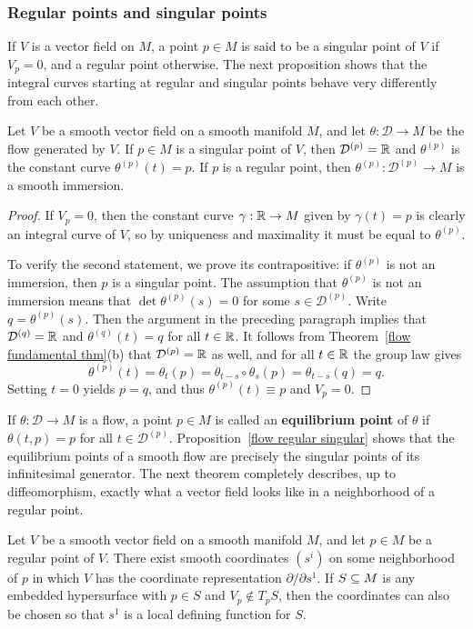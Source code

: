\subsubsection{Regular points and singular points}
If $V$ is a vector field on $M$, a point $p\in M$ is said to be a singular point of $V$ if $V_p=0$, and a regular point otherwise. The next proposition shows that the integral curves starting at regular and singular points behave very differently from each other.
\begin{proposition}\label{flow regular singular}
Let $V$ be a smooth vector field on a smooth manifold $M$, and let $\theta:\mathcal{D}\to M$ be the flow generated by $V$. If $p\in M$ is a singular point of $V$, then $\mathcal{D}^{(p)}=\mathbb{R}$ and $\theta^{(p)}$ is the constant curve $\theta^{(p)}(t)=p$. If $p$ is a regular point, then $\theta^{(p)}:\mathcal{D}^{(p)}\to M$ is a smooth immersion.
\end{proposition}
\begin{proof}
If $V_p=0$, then the constant curve $\gamma:\mathbb{R}\to M$ given by $\gamma(t)=p$ is clearly an integral curve of $V$, so by uniqueness and maximality it must be equal to $\theta^{(p)}$.\par
To verify the second statement, we prove its contrapositive: if $\theta^{(p)}$ is not an immersion, then $p$ is a singular point. The assumption that $\theta^{(p)}$ is not an immersion
means that $\det{\theta}^{(p)}(s)=0$ for some $s\in\mathcal{D}^{(p)}$. Write $q=\theta^{(p)}(s)$. Then the argument in the preceding paragraph implies that $\mathcal{D}^{(q)}=\mathbb{R}$ and $\theta^{(q)}(t)=q$ for all $t\in\mathbb{R}$. It follows from Theorem~\ref{flow fundamental thm}(b) that $\mathcal{D}^{(p)}=\mathbb{R}$ as well, and for all $t\in\mathbb{R}$ the group law gives
\[\theta^{(p)}(t)=\theta_t(p)=\theta_{t-s}\circ\theta_s(p)=\theta_{t-s}(q)=q.\]
Setting $t=0$ yields $p=q$, and thus $\theta^{(p)}(t)\equiv p$ and $V_p=0$.
\end{proof}
If $\theta:\mathcal{D}\to M$ is a flow, a point $p\in M$ is called an \textbf{equilibrium point} of $\theta$ if $\theta(t,p)=p$ for all $t\in\mathcal{D}^{(p)}$. Proposition~\ref{flow regular singular} shows that the equilibrium points of a smooth flow are precisely the singular points of its infinitesimal generator. The next theorem completely describes, up to diffeomorphism, exactly what a vector field looks like in a neighborhood of a regular point.
\begin{theorem}\label{flow canonical form}
Let $V$ be a smooth vector field on a smooth manifold $M$, and let $p\in M$ be a regular point of $V$. There exist smooth coordinates $(s^i)$ on some neighborhood of $p$ in which $V$ has the coordinate representation $\partial/\partial s^1$. If $S\subseteq M$ is any embedded hypersurface with $p\in S$ and $V_p\notin T_pS$, then the coordinates can also be chosen so that $s^1$ is a local defining function for $S$.
\end{theorem}
